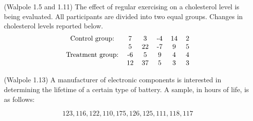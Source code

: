 \documentclass[14pt]{exam}
\begin{document}
\begin{questions}
		
		\question
		\label{ex:1_5}
		(Walpole 1.5 and 1.11)
		The effect of regular exercising on a cholesterol level is being evaluated. All participants are  divided into two equal groups. Changes in cholesterol levels reported below.
		$$
		\begin{tabular}{cccccc}
			Control group: & 7 & 3 & -4 & 14 & 2\\
						   & 5 & 22 & -7 & 9 & 5\\
			Treatment group: & -6 & 5 & 9 & 4 & 4\\
							 & 12 & 37 & 5 & 3 & 3
		\end{tabular}
		\label{tab:1_5}
		$$
		
		\question
		(Walpole 1.13)
		A manufacturer of electronic components is interested in determining the lifetime of a certain type of battery. A sample, in hours of life, is as follows:
		
		$$
		123, 116, 122, 110, 175, 126, 125, 111, 118, 117
		$$
		

\end{questions}
\end{document}
